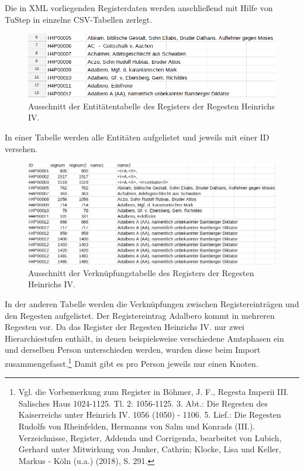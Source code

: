 \documentclass[ngerman,]{scrreprt}
\begin{document}
Die in XML vorliegenden Registerdaten werden anschließend mit Hilfe von TuStep in einzelne CSV-Tabellen zerlegt.

\begin{figure}
\centering
\includegraphics{Bilder/RI2Graph/RegisterH4-Tabelle-Entitaeten.png}
\caption{Ausschnitt der Entitätentabelle des Registers der Regesten Heinrichs IV.}
\end{figure}

In einer Tabelle werden alle Entitäten aufgelistet und jeweils mit einer ID versehen.

\begin{figure}
\centering
\includegraphics{Bilder/RI2Graph/RegisterH4-GENANNT.png}
\caption{Ausschnitt der Verknüpfungstabelle des Registers der Regesten Heinrichs IV.}
\end{figure}

In der anderen Tabelle werden die Verknüpfungen zwischen Registereinträgen und den Regesten aufgelistet. Der Registereintrag Adalbero kommt in mehreren Regesten vor. Da das Register der Regesten Heinrichs IV. nur zwei Hierarchiestufen enthält, in denen beispielsweise verschiedene Amtsphasen ein und derselben Person unterschieden werden, wurden diese beim Import zusammengefasst.\footnote{Vgl. die Vorbemerkung zum Register in Böhmer, J. F., Regesta Imperii III. Salisches Haus 1024-1125. Tl. 2: 1056-1125. 3. Abt.: Die Regesten des Kaiserreichs unter Heinrich IV. 1056 (1050) - 1106. 5. Lief.: Die Regesten Rudolfs von Rheinfelden, Hermanns von Salm und Konrads (III.). Verzeichnisse, Register, Addenda und Corrigenda, bearbeitet von Lubich, Gerhard unter Mitwirkung von Junker, Cathrin; Klocke, Lisa und Keller, Markus - Köln (u.a.) (2018), S. 291.} Damit gibt es pro Person jeweils nur einen Knoten.
\end{document}
